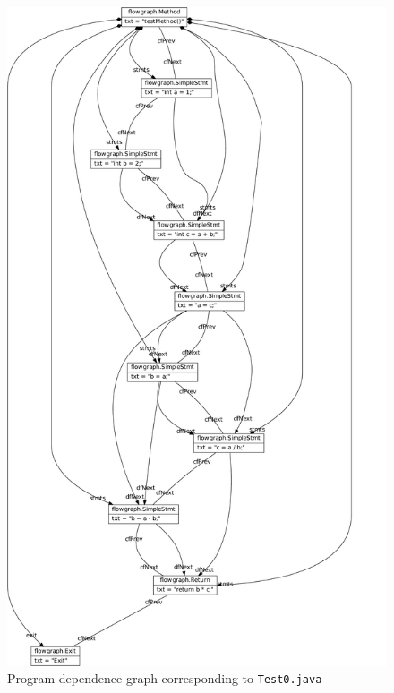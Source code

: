 \documentclass[11pt]{article}
\begin{document}
\begin{figure}[h!]
  \centering
  \includegraphics[height=0.9\textheight]{../results/Test0-DataFlowGraph}
  \caption{Program dependence graph corresponding to \texttt{Test0.java}}
  \label{fig:pdg-test0}
\end{figure}
\end{document}
